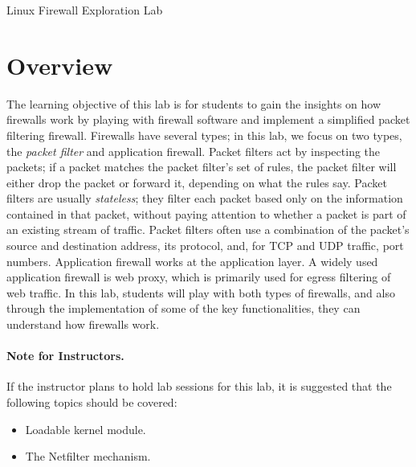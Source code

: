 








\begin{center}
{\LARGE Linux Firewall Exploration Lab}
\end{center}

\copyrightnotice

\setcounter{task}{1}
\newcommand{\tasks} {\bf {\noindent (\arabic{task})} \addtocounter{task}{1} \,}


\section{Overview}

The learning objective of this lab is for students to gain the 
insights on how firewalls work 
by playing with firewall software and implement a simplified 
packet filtering firewall.
Firewalls have several types; in this lab, we focus on two types,
the {\em packet filter} and application firewall. 
Packet filters act by inspecting the packets;
if a packet matches the packet filter's set of rules, the packet filter will 
either drop the packet or forward it, depending on what the rules say. 
Packet filters are usually {\em stateless}; they filter each packet based 
only on the information contained in that packet, without paying 
attention to whether a packet is part of an existing stream of traffic.
Packet filters often use a combination of the packet's source and 
destination address, its protocol, and, for TCP and UDP traffic, 
port numbers. Application firewall works at 
the application layer. A widely used application firewall 
is web proxy, which is primarily used for egress filtering of 
web traffic.  In this lab, students will play with both 
types of firewalls, and also through the implementation of some 
of the key functionalities, they can understand how 
firewalls work.



\paragraph{Note for Instructors.}
If the instructor plans to hold lab sessions for this lab, it is suggested 
that the following topics should be covered:
\begin{itemize}
\item Loadable kernel module.
\item The Netfilter mechanism.
\end{itemize}




